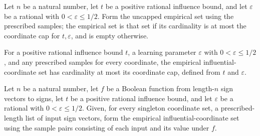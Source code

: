 \begin{definition}
\label{FABL.empiricalInfluentialCoordinates}
\leanok
{}
Let $n$ be a natural number, let $t$ be a positive rational influence bound, and let
$\varepsilon$ be a rational with $0<\varepsilon\le 1/2$. Form the uncapped empirical set
using the prescribed samples; the empirical set is that set if its cardinality is at
most the coordinate cap for $t,\varepsilon$, and is empty otherwise.
\end{definition}

\begin{theorem}
\label{FABL.card_empiricalInfluentialCoordinates_le}
\leanok
{}
For a positive rational influence bound $t$, a learning parameter $\varepsilon$ with
$0<\varepsilon\leq 1/2$, and any prescribed samples for every coordinate, the empirical
influential-coordinate set has cardinality at most its coordinate cap, defined from $t$
and $\varepsilon$.
\end{theorem}

\begin{definition}
\label{FABL.empiricalInfluentialCoordinatesFromInputs}
\leanok
{}
Let $n$ be a natural number, let $f$ be a Boolean function from length-$n$ sign vectors
to signs, let $t$ be a positive rational influence bound, and let $\varepsilon$ be a
rational with $0<\varepsilon\le 1/2$. Given, for every singleton coordinate set, a
prescribed-length list of input sign vectors, form the empirical influential-coordinate
set using the sample pairs consisting of each input and its value under $f$.
\end{definition}

